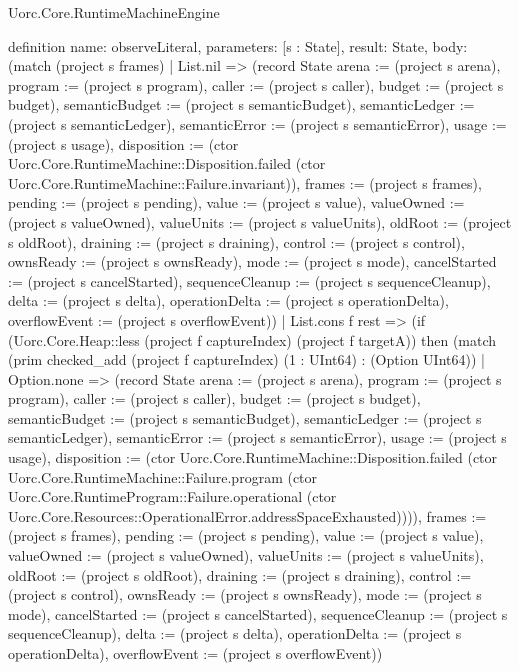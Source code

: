 \begin{lexlean}{Uorc.Core.RuntimeMachineEngine}
\begin{semanticmodule}
definition{
  name: observeLiteral,
  parameters: [s : State],
  result: State,
  body: (match (project s frames)
    | List.nil => (record State {arena := (project s arena), program := (project s program), caller := (project s caller), budget := (project s budget), semanticBudget := (project s semanticBudget), semanticLedger := (project s semanticLedger), semanticError := (project s semanticError), usage := (project s usage), disposition := (ctor Uorc.Core.RuntimeMachine::Disposition.failed (ctor Uorc.Core.RuntimeMachine::Failure.invariant)), frames := (project s frames), pending := (project s pending), value := (project s value), valueOwned := (project s valueOwned), valueUnits := (project s valueUnits), oldRoot := (project s oldRoot), draining := (project s draining), control := (project s control), ownsReady := (project s ownsReady), mode := (project s mode), cancelStarted := (project s cancelStarted), sequenceCleanup := (project s sequenceCleanup), delta := (project s delta), operationDelta := (project s operationDelta), overflowEvent := (project s overflowEvent)})
    | List.cons f rest => (if (Uorc.Core.Heap::less (project f captureIndex) (project f targetA)) then (match (prim checked_add (project f captureIndex) (1 : UInt64) : (Option UInt64))
      | Option.none => (record State {arena := (project s arena), program := (project s program), caller := (project s caller), budget := (project s budget), semanticBudget := (project s semanticBudget), semanticLedger := (project s semanticLedger), semanticError := (project s semanticError), usage := (project s usage), disposition := (ctor Uorc.Core.RuntimeMachine::Disposition.failed (ctor Uorc.Core.RuntimeMachine::Failure.program (ctor Uorc.Core.RuntimeProgram::Failure.operational (ctor Uorc.Core.Resources::OperationalError.addressSpaceExhausted)))), frames := (project s frames), pending := (project s pending), value := (project s value), valueOwned := (project s valueOwned), valueUnits := (project s valueUnits), oldRoot := (project s oldRoot), draining := (project s draining), control := (project s control), ownsReady := (project s ownsReady), mode := (project s mode), cancelStarted := (project s cancelStarted), sequenceCleanup := (project s sequenceCleanup), delta := (project s delta), operationDelta := (project s operationDelta), overflowEvent := (project s overflowEvent)})
}
\end{semanticmodule}
\end{lexlean}

